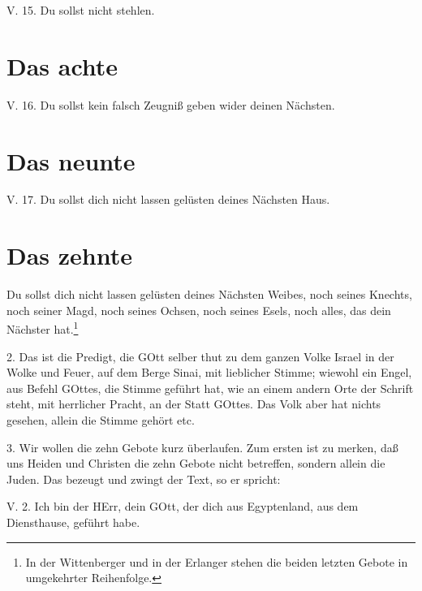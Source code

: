 \begin{schriftzitat}
V. 15. Du sollst nicht stehlen.
\end{schriftzitat}

\section{Das achte}

\begin{schriftzitat}
V. 16. Du sollst kein falsch Zeugniß geben wider deinen Nächsten.
\end{schriftzitat}

\section{Das neunte}

\begin{schriftzitat}
V. 17. Du sollst dich nicht lassen gelüsten deines Nächsten Haus.
\end{schriftzitat}

\section{Das zehnte}

Du sollst dich nicht lassen gelüsten deines Nächsten Weibes, noch seines Knechts, noch seiner Magd, noch seines Ochsen, noch seines Esels, noch alles, das dein Nächster hat.\footnote{In der Wittenberger und in der Erlanger stehen die beiden letzten Gebote in umgekehrter Reihenfolge.}

2. Das ist die Predigt, die GOtt selber thut zu dem ganzen Volke Israel in der Wolke und Feuer, auf dem Berge Sinai, mit lieblicher Stimme; wiewohl ein Engel, aus Befehl GOttes, die Stimme geführt hat, wie an einem andern Orte der Schrift steht, mit herrlicher Pracht, an der Statt GOttes. Das Volk aber hat nichts gesehen, allein die Stimme gehört etc.

3. Wir wollen die zehn Gebote kurz überlaufen. Zum ersten ist zu merken, daß uns Heiden und Christen die zehn Gebote nicht betreffen, sondern allein die Juden. Das bezeugt und zwingt der Text, so er spricht:

\begin{schriftzitat}
V. 2. Ich bin der HErr, dein GOtt, der dich aus Egyptenland, aus dem Diensthause, geführt habe.
\end{schriftzitat}


